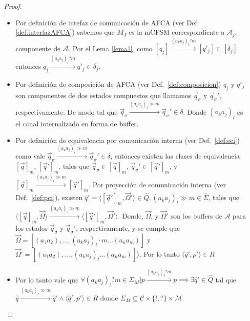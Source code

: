 \begin{proof}
\begin{itemize}
    \item Por definición de intefaz de comunicación de AFCA (ver Def.\ref{def:interfazAFCA}) sabemos que $M_J$ es la mCFSM correspondiente a $\mathcal{A}_j$, componente de $\mathcal{A}$. Por el Lema \ref{lema1}, como $[q_j] \xrightarrow{(a_ka_j)_l?m} [q'_j] \in [\delta_j]$ entonces $q_j \xrightarrow{(a_ka_j)_l?m} q'_j \in \delta_j$.
    
    \item Por definición de composición de AFCA (ver Def.~\ref{def:composicion}) $q_j$ y $q'_j$ son componentes de dos estados compuestos que llamamos $\overrightarrow{q}_{\sigma}$ y $\overrightarrow{q}_{\sigma}'$, respectivamente. De modo tal que $\overrightarrow{q}_{\sigma} \xrightarrow{(a_ka_j)_l \gg m} \overrightarrow{q}_{\sigma}' \in \delta$. Donde $(a_ka_j)_l$ es el canal internalizado en forma de buffer.
    
    \item Por definición de equivalencia por comunicación interna (ver Def.~\ref{def:eci}) como vale $\overrightarrow{q}_{\sigma} \xrightarrow{(a_ka_j)_l \gg m} \overrightarrow{q}_{\sigma}' \in \delta$, entonces existen las clases de equivalencia $[\overrightarrow{q}]_m$, $[\overrightarrow{q}']_m$, tales que $\overrightarrow{q}_{\sigma} \in [\overrightarrow{q}]_m $, $\overrightarrow{q}_{\sigma}' \in [\overrightarrow{q}']_m$, y $[\overrightarrow{q}]_m \xrightarrow{(a_ka_j)_l \gg m} [\overrightarrow{q}']_m$. Por proyección de comunicación interna (ver Def.~\ref{def:pci}), existen $\widehat{q}' = \langle [\overrightarrow{q}']_m, \overrightarrow{\Omega}' \rangle \in \widehat{Q}, (a_ka_j)_l \gg m \in \widehat{\Sigma}$, tales que $\langle [\overrightarrow{q}]_m, \overrightarrow{\Omega} \rangle \xrightarrow{(a_ka_j)_l \gg m} \langle [\overrightarrow{q}']_m, \overrightarrow{\Omega}' \rangle$. Donde, $\overrightarrow{\Omega}$, y $\overrightarrow{\Omega}'$ son los buffers de $\mathcal{A}$ para los estados $\overrightarrow{q}_{\sigma}$ y  $\overrightarrow{q}_{\sigma}'$, respectivamente, y se cumple que $\overrightarrow{\Omega} = [(a_1a_2), \ldots, (a_ka_j)_l \cdot m \ldots (a_na_m)]$ y $\overrightarrow{\Omega}' = [(a_1a_2), \ldots, (a_ka_j)_l \ldots (a_na_m)] \rangle$. Por lo tanto $\langle \widehat{q}', p' \rangle \in R$ 
    
    \item Por lo tanto vale que $\forall (a_ka_j)_l?m \in \Sigma_M | p \xrightarrow{(a_ka_j)_l?m} p \implies \exists \widehat{q}' \in \widehat{Q}$ tal que $\widehat{q} \xrightarrow{(a_ka_j)_l \gg m} \widehat{q}' \land \langle \widehat{q}', p'\rangle \in R$ donde $\Sigma_M \subseteq \mathcal{C} \times \{!,?\} \times \mathcal{M}$
    
\end{itemize}
\end{proof}

